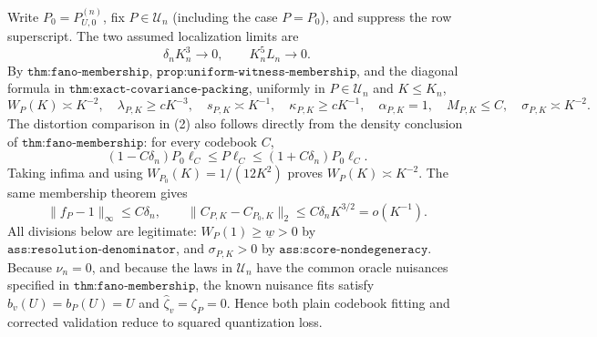 Write \(P_0=P_{U,0}^{(n)}\), fix \(P\in\mathcal U_n\) (including the case \(P=P_0\)), and suppress the row superscript.  The two assumed localization limits are
\[
 \delta_nK_n^3\longrightarrow0,
 \qquad K_n^5L_n\longrightarrow0.                                             \tag{1}
\]
By \(\texttt{thm:fano-membership}\), \(\texttt{prop:uniform-witness-membership}\), and the diagonal formula in \(\texttt{thm:exact-covariance-packing}\), uniformly in \(P\in\mathcal U_n\) and \(K\leq K_n\),
\[
 W_P(K)\asymp K^{-2},\quad \lambda_{P,K}\geq cK^{-3},\quad
 s_{P,K}\asymp K^{-1},\quad \kappa_{P,K}\geq cK^{-1},\quad
 \alpha_{P,K}=1,\quad M_{P,K}\leq C,\quad \sigma_{P,K}\asymp K^{-2}.        \tag{2}
\]
The distortion comparison in (2) also follows directly from the density conclusion of \(\texttt{thm:fano-membership}\): for every codebook \(C\),
\[
 (1-C\delta_n)P_0\ell_C\leq P\ell_C\leq(1+C\delta_n)P_0\ell_C.
\]
Taking infima and using \(W_{P_0}(K)=1/(12K^2)\) proves \(W_P(K)\asymp K^{-2}\).  The same membership theorem gives
\[
 \|f_P-1\|_\infty\leq C\delta_n,\qquad
 \|C_{P,K}-C_{P_0,K}\|_2\leq C\delta_nK^{3/2}=o(K^{-1}).                    \tag{3}
\]
All divisions below are legitimate: \(W_P(1)\geq\underline w>0\) by \(\texttt{ass:resolution-denominator}\), and \(\sigma_{P,K}>0\) by \(\texttt{ass:score-nondegeneracy}\).  Because \(\nu_n=0\), and because the laws in \(\mathcal U_n\) have the common oracle nuisances specified in \(\texttt{thm:fano-membership}\), the known nuisance fits satisfy \(\widehat b_v(U)=b_P(U)=U\) and \(\widehat\zeta_v=\zeta_P=0\).  Hence both plain codebook fitting and corrected validation reduce to squared quantization loss.

